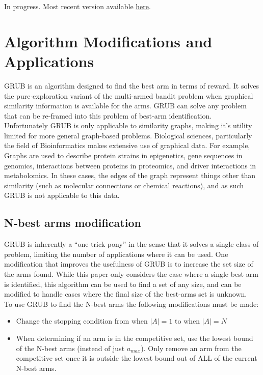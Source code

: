 \documentclass{article}[12pt]
\begin{document}
In progress.
Most recent version available \href{https://github.com/sstalley/RPE_GRUB}{here}.

\pagebreak

\section{Algorithm Modifications and Applications}

GRUB is an algorithm designed to find the best arm in terms of reward.
It solves the pure-exploration variant of the multi-armed bandit problem when graphical similarity information is available for the arms.
GRUB can solve any problem that can be re-framed into this problem of best-arm identification. \\

Unfortunately GRUB is only applicable to similarity graphs, making it’s utility limited for more general graph-based problems.
Biological sciences, particularly the field of Bioinformatics makes extensive use of graphical data.
For example, Graphs are used to describe protein strains in epigenetics, gene sequences in genomics, interactions between proteins in proteomics, and driver interactions in metabolomics.
In these cases, the edges of the graph represent things other than similarity (such as molecular connections or chemical reactions), and as such GRUB is not applicable to this data.

\subsection{N-best arms modification}

GRUB is inherently a ``one-trick pony'' in the sense that it solves a single class of problem, limiting the number of applications where it can be used.
One modification that improves the usefulness of GRUB is to increase the set size of the arms found.
While this paper only considers the case where a single best arm is identified, this algorithm can be used to find a set of any size,
and can be modified to handle cases where the final size of the best-arms set is unknown. \\

To use GRUB to find the N-best arms the following modifications must be made: \\
\begin{itemize}
    \item Change the stopping condition from when $|A|=1$ to when $|A|=N$
    \item When determining if an arm is in the competitive set, use the lowest bound of the N-best arms (instead of just $a_{max}$).
    Only remove an arm from the competitive set once it is outside the lowest bound out of ALL of the current N-best arms.
\end{itemize}
\end{document}
